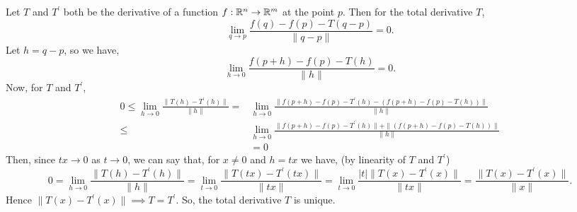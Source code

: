 
\begin{solution}
    Let $T$ and $T^\prime$ both be the derivative
    of a function $f:\mathbb{R}^n\to\mathbb{R}^m$ at the point $p$.
    Then for
    the total derivative $T$,
    $$\lim_{q\to p}{\frac{f(q)-f(p)-T(q-p)}{\|q-p\|}}=0.$$
    Let $h=q-p$, so we have,
    $$\lim_{h\to 0}{\frac{f(p+h)-f(p)-T(h)}{\|h\|}}=0.$$
    Now, for $T$ and $T^\prime$,
    \begin{align*}
        0\leq \lim_{h\to 0}{\frac{\|T(h)-T^\prime(h)\|}{\|h\|}}
        =&\lim_{h\to 0}{\frac{\|f(p+h)-f(p)-T^\prime(h)-
        (f(p+h)-f(p)-T(h))\|}{\|h\|}}\\
        \leq
        &\lim_{h\to 0}{\frac{\|f(p+h)-f(p)-T^\prime(h)\|+
        \|(f(p+h)-f(p)-T(h))\|}{\|h\|}}\\
        &=0
    \end{align*}
    Then, since $tx\to 0$ as $t\to 0$, we can say that,
    for $x\neq 0$ and $h=tx$ we have, (by linearity of
    $T$ and $T^\prime$)
    $$0=\lim_{h\to 0}{\frac{\|T(h)-T^\prime(h)\|}{\|h\|}}
    =\lim_{t\to 0}{\frac{\|T(tx)-T^\prime(tx)\|}{\|tx\|}}
    =\lim_{t\to 0}{\frac{|t|\|T(x)-T^\prime(x)\|}{\|tx\|}}
    =\frac{\|T(x)-T^\prime(x)\|}{\|x\|}.$$
    Hence $\|T(x)-T^\prime(x)\|\implies T=T^\prime$.
    So, the total derivative $T$ is unique.
\end{solution}